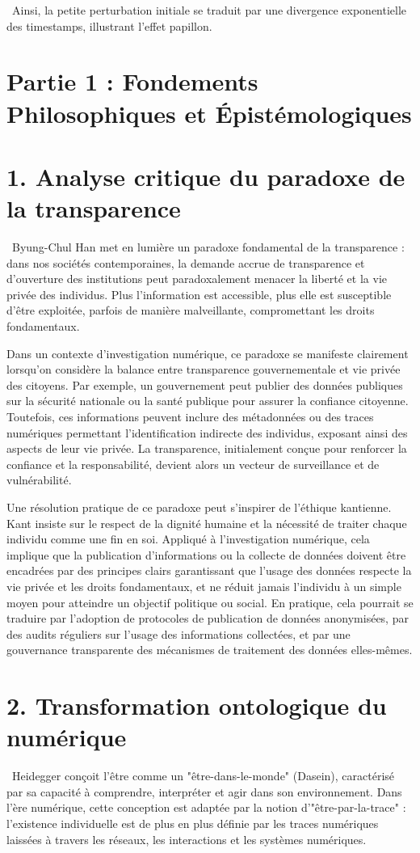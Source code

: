 \documentclass[12pt,a4paper]{report}
\begin{document}
{		\noindent\
		Ainsi, la petite perturbation initiale se traduit par une divergence exponentielle des timestamps, illustrant l’effet papillon.
		\section*{Partie 1 : Fondements Philosophiques et Épistémologiques}
\section*{1. Analyse critique du paradoxe de la transparence}\
Byung-Chul Han met en lumière un paradoxe fondamental de la transparence : dans nos sociétés contemporaines, la demande accrue de transparence et d’ouverture des institutions peut paradoxalement menacer la liberté et la vie privée des individus. Plus l’information est accessible, plus elle est susceptible d’être exploitée, parfois de manière malveillante, compromettant les droits fondamentaux.


Dans un contexte d’investigation numérique, ce paradoxe se manifeste clairement lorsqu’on considère la balance entre transparence gouvernementale et vie privée des citoyens. Par exemple, un gouvernement peut publier des données publiques sur la sécurité nationale ou la santé publique pour assurer la confiance citoyenne. Toutefois, ces informations peuvent inclure des métadonnées ou des traces numériques permettant l’identification indirecte des individus, exposant ainsi des aspects de leur vie privée. La transparence, initialement conçue pour renforcer la confiance et la responsabilité, devient alors un vecteur de surveillance et de vulnérabilité.


Une résolution pratique de ce paradoxe peut s’inspirer de l’éthique kantienne. Kant insiste sur le respect de la dignité humaine et la nécessité de traiter chaque individu comme une fin en soi. Appliqué à l’investigation numérique, cela implique que la publication d’informations ou la collecte de données doivent être encadrées par des principes clairs garantissant que l’usage des données respecte la vie privée et les droits fondamentaux, et ne réduit jamais l’individu à un simple moyen pour atteindre un objectif politique ou social. En pratique, cela pourrait se traduire par l’adoption de protocoles de publication de données anonymisées, par des audits réguliers sur l’usage des informations collectées, et par une gouvernance transparente des mécanismes de traitement des données elles-mêmes.


\section*{2. Transformation ontologique du numérique}\
Heidegger conçoit l’être comme un "être-dans-le-monde" (Dasein), caractérisé par sa capacité à comprendre, interpréter et agir dans son environnement. Dans l’ère numérique, cette conception est adaptée par la notion d’"être-par-la-trace" : l’existence individuelle est de plus en plus définie par les traces numériques laissées à travers les réseaux, les interactions et les systèmes numériques.


}
\end{document}
